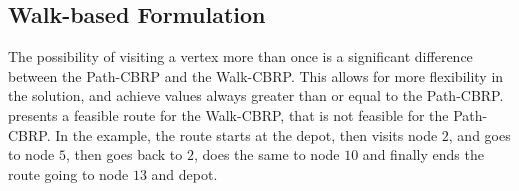 \subsection{Walk-based Formulation}\label{sec:cbrp-walk-based-formulation}

The possibility of visiting a vertex more than once is a significant difference
between the Path-CBRP and the Walk-CBRP. This allows for more flexibility in the
solution, and achieve values always greater than or equal to the Path-CBRP.
 presents a feasible route for the
Walk-CBRP, that is not feasible for the Path-CBRP. In the example, the route
starts at the depot, then visits node $2$, and goes to node $5$, then goes back
to $2$, does the same to node $10$ and finally ends the route going to node $13$
and depot.


